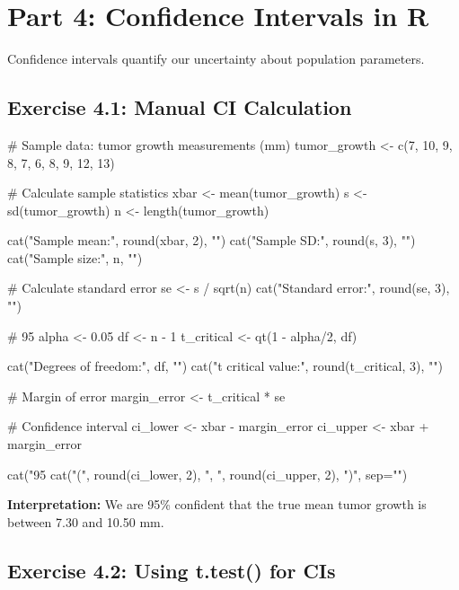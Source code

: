 \documentclass[11pt]{article}
\begin{document}
\section{Part 4: Confidence Intervals in R}

Confidence intervals quantify our uncertainty about population parameters.

\subsection{Exercise 4.1: Manual CI Calculation}

\begin{rcode}
# Sample data: tumor growth measurements (mm)
tumor_growth <- c(7, 10, 9, 8, 7, 6, 8, 9, 12, 13)

# Calculate sample statistics
xbar <- mean(tumor_growth)
s <- sd(tumor_growth)
n <- length(tumor_growth)

cat("Sample mean:", round(xbar, 2), "\n")
cat("Sample SD:", round(s, 3), "\n")
cat("Sample size:", n, "\n\n")

# Calculate standard error
se <- s / sqrt(n)
cat("Standard error:", round(se, 3), "\n\n")

# 95%
alpha <- 0.05
df <- n - 1
t_critical <- qt(1 - alpha/2, df)

cat("Degrees of freedom:", df, "\n")
cat("t critical value:", round(t_critical, 3), "\n\n")

# Margin of error
margin_error <- t_critical * se

# Confidence interval
ci_lower <- xbar - margin_error
ci_upper <- xbar + margin_error

cat("95%
cat("(", round(ci_lower, 2), ", ", round(ci_upper, 2), ")\n", sep="")
\end{rcode}

\textbf{Interpretation:} We are 95\% confident that the true mean tumor growth is between 7.30 and 10.50 mm.

\subsection{Exercise 4.2: Using t.test() for CIs}

\end{document}
